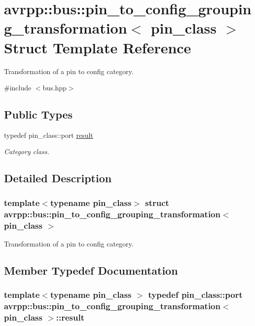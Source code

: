 \hypertarget{structavrpp_1_1bus_1_1pin__to__config__grouping__transformation}{
\section{avrpp::bus::pin\_\-to\_\-config\_\-grouping\_\-transformation$<$ pin\_\-class $>$ Struct Template Reference}
\label{structavrpp_1_1bus_1_1pin__to__config__grouping__transformation}
}


Transformation of a pin to config category.  




{\ttfamily \#include $<$bus.hpp$>$}

\subsection*{Public Types}
\begin{DoxyCompactItemize}
\item 
typedef pin\_\-class::port \hyperlink{structavrpp_1_1bus_1_1pin__to__config__grouping__transformation_a7a5ff8210f3955407901d848cb0d9a5b}{result}
\begin{DoxyCompactList}\small\item\em Category class. \item\end{DoxyCompactList}\end{DoxyCompactItemize}


\subsection{Detailed Description}
\subsubsection*{template$<$typename pin\_\-class$>$ struct avrpp::bus::pin\_\-to\_\-config\_\-grouping\_\-transformation$<$ pin\_\-class $>$}

Transformation of a pin to config category. 

\subsection{Member Typedef Documentation}
\hypertarget{structavrpp_1_1bus_1_1pin__to__config__grouping__transformation_a7a5ff8210f3955407901d848cb0d9a5b}{
\subsubsection[{result}]{\setlength{\rightskip}{0pt plus 5cm}template$<$typename pin\_\-class $>$ typedef pin\_\-class::port {\bf avrpp::bus::pin\_\-to\_\-config\_\-grouping\_\-transformation}$<$ pin\_\-class $>$::{\bf result}}}
\label{structavrpp_1_1bus_1_1pin__to__config__grouping__transformation_a7a5ff8210f3955407901d848cb0d9a5b}


